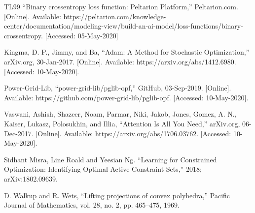 \documentclass[11pt]{article}
\begin{document}
\begin{thebibliography} {TL99}
{\sc }
“Binary crossentropy loss function: Peltarion Platform,” Peltarion.com. [Online]. Available: https://peltarion.com/knowledge-center/documentation/modeling-view/build-an-ai-model/loss-functions/binary-crossentropy. [Accessed: 05-May-2020]

{\sc Kingma, D. P., Jimmy, and Ba,} 
“Adam: A Method for Stochastic Optimization,” arXiv.org, 30-Jan-2017. [Online]. Available: https://arxiv.org/abs/1412.6980. [Accessed: 10-May-2020].

Power-Grid-Lib, “power-grid-lib/pglib-opf,” GitHub, 03-Sep-2019. [Online]. Available: https://github.com/power-grid-lib/pglib-opf. [Accessed: 10-May-2020].

{\sc Vaswani, Ashish, Shazeer, Noam, Parmar, Niki, Jakob, Jones, Gomez, A. N., Kaiser, Lukasz, Polosukhin, and Illia,}  
“Attention Is All You Need,” arXiv.org, 06-Dec-2017. [Online]. Available: https://arxiv.org/abs/1706.03762. [Accessed: 10-May-2020].

\bibitem{}
{\sc }

Sidhant Misra, Line Roald and Yeesian Ng.
\newblock “Learning for Constrained Optimization: Identifying Optimal Active Constraint Sets,” 2018;
\newblock arXiv:1802.09639.

\bibitem{}
{\sc D. Walkup and R. Wets,}
“Lifting projections of convex polyhedra,” Pacific Journal of Mathematics, vol. 28, no. 2, pp. 465–475, 1969.


\end{thebibliography}
\end{document}

